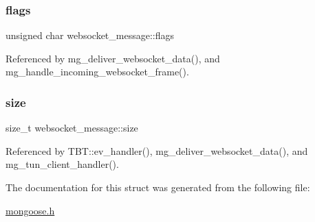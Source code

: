 \subsubsection{\texorpdfstring{flags}{flags}}
{\footnotesize\ttfamily unsigned char websocket\+\_\+message\+::flags}



Referenced by mg\+\_\+deliver\+\_\+websocket\+\_\+data(), and mg\+\_\+handle\+\_\+incoming\+\_\+websocket\+\_\+frame().

\mbox{\label{structwebsocket__message_af7ae89c0cba9566b64a47d40c5ea700a_af7ae89c0cba9566b64a47d40c5ea700a}} 
\subsubsection{\texorpdfstring{size}{size}}
{\footnotesize\ttfamily size\+\_\+t websocket\+\_\+message\+::size}



Referenced by T\+B\+T\+::ev\+\_\+handler(), mg\+\_\+deliver\+\_\+websocket\+\_\+data(), and mg\+\_\+tun\+\_\+client\+\_\+handler().



The documentation for this struct was generated from the following file\+:\begin{DoxyCompactItemize}
\item 
\hyperlink{mongoose_8h}{mongoose.\+h}\end{DoxyCompactItemize}
